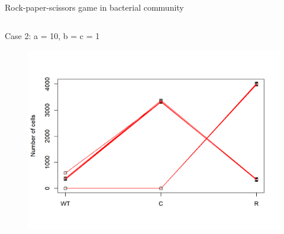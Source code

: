 \begin{frame}{Rock-paper-scissors game in bacterial community}

	\begin{columns}
		\begin{column}{0.5\textwidth}
		Case 2: a = 10,  b = c = 1
			\begin{figure}
				\includegraphics[scale=0.35]{img/CRS_caso2_1.png}			
			\end{figure}
		\end{column}


\end{columns}
\end{frame}
